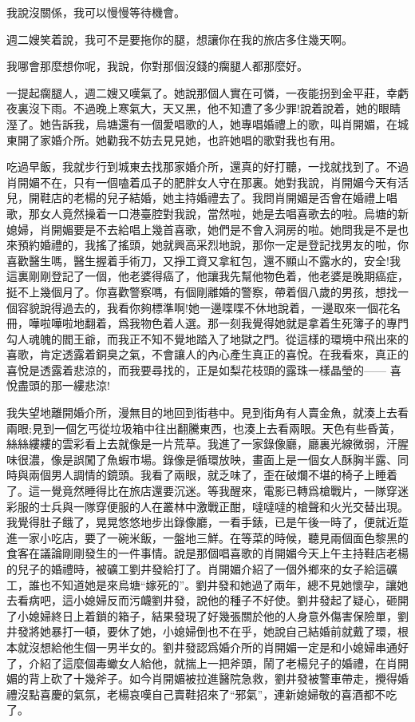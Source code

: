 \documentclass[a6paper]{article}
\begin{document}
我說沒關係，我可以慢慢等待機會。

週二嫂笑着說，我可不是要拖你的腿，想讓你在我的旅店多住幾天啊。

我哪會那麼想你呢，我說，你對那個沒錢的瘸腿人都那麼好。

一提起瘸腿人，週二嫂又嘆氣了。她說那個人實在可憐，一夜能拐到金平莊，幸虧夜裏沒下雨。不過晚上寒氣大，天又黑，他不知遭了多少罪!說着說着，她的眼睛溼了。她告訴我，烏塘還有一個愛唱歌的人，她專唱婚禮上的歌，叫肖開媚，在城東開了家婚介所。她勸我不妨去見見她，也許她唱的歌對我也有用。

吃過早飯，我就步行到城東去找那家婚介所，還真的好打聽，一找就找到了。不過肖開媚不在，只有一個嗑着瓜子的肥胖女人守在那裏。她對我說，肖開媚今天有活兒，開鞋店的老楊的兒子結婚，她主持婚禮去了。我問肖開媚是否會在婚禮上唱歌，那女人竟然操着一口港臺腔對我說，當然啦，她是去唱喜歌去的啦。烏塘的新媳婦，肖開媚要是不去給唱上幾首喜歌，她們是不會入洞房的啦。她問我是不是也來預約婚禮的，我搖了搖頭，她就興高采烈地說，那你一定是登記找男友的啦，你喜歡醫生嗎，醫生握着手術刀，又掙工資又拿紅包，還不顯山不露水的，安全!我這裏剛剛登記了一個，他老婆得癌了，他讓我先幫他物色着，他老婆是晚期癌症，挺不上幾個月了。你喜歡警察嗎，有個剛離婚的警察，帶着個八歲的男孩，想找一個容貌說得過去的，我看你夠標準啊!她一邊喋喋不休地說着，一邊取來一個花名冊，嘩啦嘩啦地翻着，爲我物色着人選。那一刻我覺得她就是拿着生死簿子的專門勾人魂魄的閻王爺，而我正不知不覺地踏入了地獄之門。從這樣的環境中飛出來的喜歌，肯定透露着銅臭之氣，不會讓人的內心產生真正的喜悅。在我看來，真正的喜悅是透露着悲涼的，而我要尋找的，正是如梨花枝頭的露珠一樣晶瑩的—— 喜悅盡頭的那一縷悲涼!

我失望地離開婚介所，漫無目的地回到街巷中。見到街角有人賣金魚，就湊上去看兩眼;見到一個乞丐從垃圾箱中往出翻騰東西，也湊上去看兩眼。天色有些昏黃，絲絲縷縷的雲彩看上去就像是一片荒草。我進了一家錄像廳，廳裏光線微弱，汗腥味很濃，像是誤闖了魚蝦市場。錄像是循環放映，畫面上是一個女人酥胸半露、同時與兩個男人調情的鏡頭。我看了兩眼，就乏味了，歪在破爛不堪的椅子上睡着了。這一覺竟然睡得比在旅店還要沉迷。等我醒來，電影已轉爲槍戰片，一隊穿迷彩服的士兵與一隊穿便服的人在叢林中激戰正酣，噠噠噠的槍聲和火光交替出現。我覺得肚子餓了，晃晃悠悠地步出錄像廳，一看手錶，已是午後一時了，便就近踅進一家小吃店，要了一碗米飯，一盤地三鮮。在等菜的時候，聽見兩個面色黎黑的食客在議論剛剛發生的一件事情。說是那個唱喜歌的肖開媚今天上午主持鞋店老楊的兒子的婚禮時，被礦工劉井發給打了。肖開媚介紹了一個外鄉來的女子給這礦工，誰也不知道她是來烏塘“嫁死的”。劉井發和她過了兩年，總不見她懷孕，讓她去看病吧，這小媳婦反而污衊劉井發，說他的種子不好使。劉井發起了疑心，砸開了小媳婦終日上着鎖的箱子，結果發現了好幾張關於他的人身意外傷害保險單，劉井發將她暴打一頓，要休了她，小媳婦倒也不在乎，她說自己結婚前就戴了環，根本就沒想給他生個一男半女的。劉井發認爲婚介所的肖開媚一定是和小媳婦串通好了，介紹了這麼個毒蠍女人給他，就揣上一把斧頭，鬧了老楊兒子的婚禮，在肖開媚的背上砍了十幾斧子。如今肖開媚被拉進醫院急救，劉井發被警車帶走，攪得婚禮沒點喜慶的氣氛，老楊哀嘆自己賣鞋招來了“邪氣”，連新媳婦敬的喜酒都不吃了。
\end{document}
